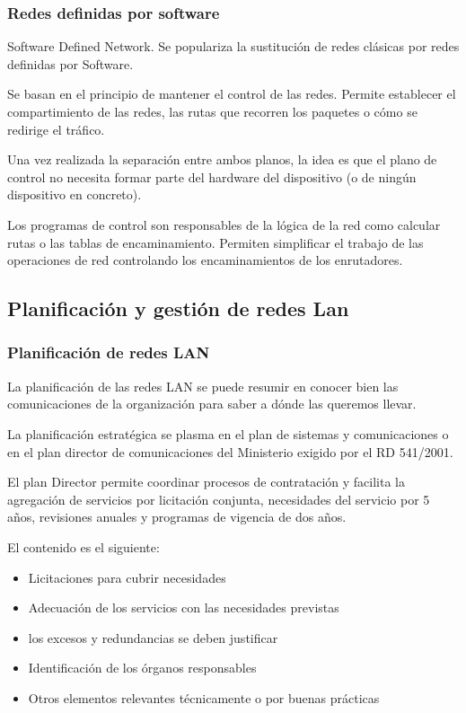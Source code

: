     \subsubsection{Redes definidas por software} %
        Software Defined Network. Se populariza la sustitución de redes clásicas por redes definidas por Software.

        Se basan en el principio de mantener el control de las redes. Permite establecer el compartimiento de las redes, las rutas que recorren los paquetes o cómo se redirige el tráfico.

        Una vez realizada la separación entre ambos planos, la idea es que el plano de control no necesita formar parte del hardware del dispositivo (o de ningún dispositivo en concreto).

        Los programas de control son responsables de la lógica de la red como calcular rutas o las tablas de encaminamiento. Permiten simplificar el trabajo de las operaciones de red controlando los encaminamientos de los enrutadores.

\subsection{Planificación y gestión de redes Lan} %
    \subsubsection{Planificación de redes LAN} %
        La planificación de las redes LAN se puede resumir en conocer bien las comunicaciones de la organización para saber a dónde las queremos llevar.

        La planificación estratégica se plasma en el plan de sistemas y comunicaciones o en el plan director de comunicaciones del Ministerio exigido por el RD 541/2001.

        El plan Director permite coordinar procesos de contratación y facilita la agregación de servicios por licitación conjunta, necesidades del servicio por 5 años, revisiones anuales y programas de vigencia de dos años. 

        El contenido es el siguiente:
        \begin{itemize}
            \item Licitaciones para cubrir necesidades
            \item Adecuación de los servicios con las necesidades previstas
            \item los excesos y redundancias se deben justificar
            \item Identificación de los órganos responsables
            \item Otros elementos relevantes técnicamente o por buenas prácticas
        \end{itemize}

